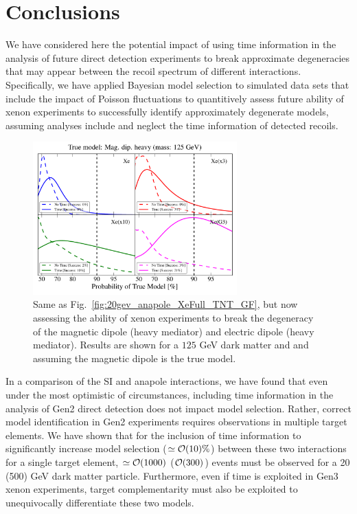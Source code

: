 \documentclass[11pt]{article}
\begin{document}
\section{Conclusions}\label{sec:conclusion}
We have considered here the potential impact of using time information in the analysis of future direct detection experiments to break approximate degeneracies that may appear between the recoil spectrum of different interactions. Specifically, we have applied Bayesian model selection to simulated data sets that include the impact of Poisson fluctuations to quantitively assess future ability of xenon experiments to successfully identify approximately degenerate models, assuming analyses include and neglect the time information of detected recoils.

 
 \begin{figure}
\centering
\includegraphics[width=0.7\textwidth]{plots/PDF_125GeV_Magdipheavy_50sims_Xe_Xe3x_Xe10x_XeG3_GF_TNT.pdf}
\caption{\label{fig:125gev_Mag.dip.heavy_XeFull_TNT_GF}
Same as Fig.~\ref{fig:20gev_anapole_XeFull_TNT_GF}, but now assessing the ability of xenon experiments to break the degeneracy of the magnetic dipole (heavy mediator) and electric dipole (heavy mediator). Results are shown for a $125$ GeV dark matter and and assuming the magnetic dipole is the true model.}
\end{figure}


In a comparison of the SI and anapole interactions, we have found that even under the most optimistic of circumstances, including time information in the analysis of Gen2 direct detection does not impact model selection. Rather, correct model identification in Gen2 experiments requires observations in multiple target elements. We have shown that for the inclusion of time information to significantly increase model selection ($\simeq {\cal O}(10)\%$) between these two interactions for a single target element, $\simeq {\cal O}(1000)$ (${\cal O}(300)$) events must be observed for a 20 (500) GeV dark matter particle. Furthermore, even if time is exploited in Gen3 xenon experiments, target complementarity must also be exploited to unequivocally differentiate these two models.
\end{document}
